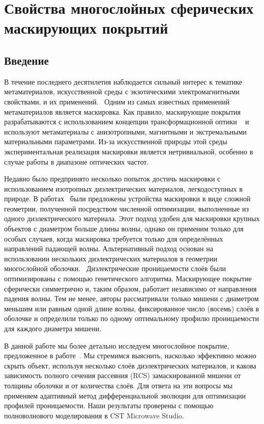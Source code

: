 \chapter{Свойства многослойных сферических маскирующих
  покрытий} \label{chapt3}
\section{Введение}
В течение последнего десятилетия наблюдается сильный интерес к
тематике метаматериалов, искусственной среды с экзотическими
электромагнитными свойствами, и их применений.~\cite{Smith-2004,
  Schurig-2006, Shalaev-2007, Kivshar-2012} Одним из самых известных
применений метаматериалов является маскировка. Как правило,
маскирующие покрытия разрабатываются с использованием концепции
трансформационной оптики ~\cite{pendry_TO, Leonhardt-2006} и
используют метаматериалы с анизотропными, магнитными и экстремальными
материальными параметрами. Из-за искусственной природы этой среды
экспериментальная реализация маскировки является нетривиальной,
особенно в случае работы в диапазоне оптических
частот.~\cite{Kildishev:2011, alu, XU-Su:120408}

Недавно было предпринято несколько попыток достичь маскировки с
использованием изотропных диэлектрических материалов, легкодоступных в
природе. В работах~\cite{Sigmund-AllDiel-2011,
  smith-3dprinterCloak-2013, Fujii_topolOpti_theory_2013,
  ma-experiment-topology-2013} были предложены устройства маскировки в
виде сложной геометрии, полученной посредством численной оптимизации,
выполненные из одного диэлектрического материала.  Этот подход удобен
для маскировки крупных объектов с диаметром больше длины волны, однако
он применим только для особых случаев, когда маскировка требуется
только для определённых направлений падающей волны. Альтернативный
подход основан на использовании нескольких диэлектрических материалов
в геометрии многослойной оболочки.~\cite{semouchkina2,
  semouchkina_sphere_multilayer} Диэлектрические проницаемости слоёв
были оптимизированы с помощью генетического алгоритма. Маскирующее
покрытие сферически симметрично и, таким образом, работает независимо
от направления падения волны. Тем не менее, авторы рассматривали
только мишени с диаметром меньшим или равным одной длине волны,
фиксированное число (восемь) слоёв в оболочке и определили только по
одному оптимальному профилю проницаемости для каждого диаметра мишени.


В данной работе мы более детально исследуем многослойное покрытие,
предложенное в работе~\cite{semouchkina_sphere_multilayer}. Мы
стремимся выяснить, насколько эффективно можно скрыть объект,
используя несколько слоёв диэлектрических материалов, и какова
зависимость полного сечения рассеяния (RCS) замаскированной
мишени от толщины оболочки и от количества слоёв. Для ответа на эти
вопросы мы применяем адаптивный метод дифференциальной эволюции для
оптимизации профилей проницаемости. Наши результаты проверены с
помощью полноволнового моделирования в CST Microwave
Studio.\cite{CST-web}
 
